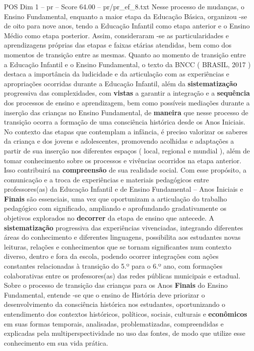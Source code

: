 \begin{textsample}{POS Dim 1 – pr – Score 64.00 – pr/pr\_ef\_8.txt}
Nesse processo de mudanças, o Ensino Fundamental, enquanto a maior etapa da Educação Básica, organizou -se de oito para nove anos, tendo a Educação Infantil como etapa anterior e o Ensino Médio como etapa posterior.
Assim, consideraram -se as particularidades e aprendizagens próprias das etapas e faixas etárias atendidas, bem como dos momentos de transição entre as mesmas.
Quanto ao momento de transição entre a Educação Infantil e o Ensino Fundamental, o texto da BNCC ( BRASIL, 2017 ) destaca a importância da ludicidade e da articulação com as experiências e apropriações ocorridas durante a Educação Infantil, além da \textbf{sistematização} progressiva das complexidades, com \textbf{vistas} a garantir a integração e a \textbf{sequência} dos processos de ensino e aprendizagem, bem como possíveis mediações durante a inserção das crianças no Ensino Fundamental, de \textbf{maneira} que nesse processo de transição ocorra a formação de uma consciência histórica desde os Anos Iniciais.
No contexto das etapas que contemplam a infância, é preciso valorizar os saberes da criança e dos jovens e adolescentes, promovendo acolhidas e adaptações a partir de sua inserção nos diferentes espaços ( local, regional e mundial ), além de tomar conhecimento sobre os processos e vivências ocorridos na etapa anterior.
Isso contribuirá na \textbf{compreensão} de sua realidade social.
Com esse propósito, a comunicação e a troca de experiências e materiais pedagógicos entre professores(as) da Educação Infantil e de Ensino Fundamental – Anos Iniciais e \textbf{Finais} são essenciais, uma vez que oportunizam a articulação do trabalho pedagógico com significado, ampliando e aprofundando gradativamente os objetivos explorados no \textbf{decorrer} da etapa de ensino que antecede.
A \textbf{sistematização} progressiva das experiências vivenciadas, integrando diferentes áreas do conhecimento e diferentes linguagens, possibilita aos estudantes novas leituras, relações e conhecimentos que se tornam significantes num contexto diverso, dentro e fora da escola, podendo ocorrer integrações com ações constantes relacionadas à transição do 5.º para o 6.º ano, com formações colaborativas entre os professores(as) das redes públicas municipais e estadual.
Sobre o processo de transição das crianças para os Anos \textbf{Finais} do Ensino Fundamental, entende -se que o ensino de História deve priorizar o desenvolvimento da consciência histórica nos estudantes, oportunizando o entendimento dos contextos históricos, políticos, sociais, culturais e \textbf{econômicos} em suas formas temporais, analisadas, problematizadas, compreendidas e explicadas pela multiperspectividade no uso das fontes, de modo que utilize esse conhecimento em sua vida prática.

\end{textsample}
